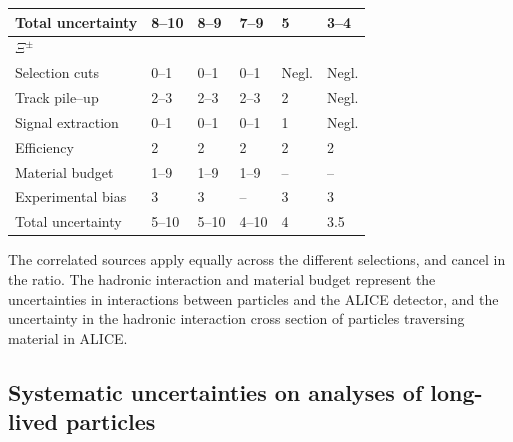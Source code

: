 \begin{table}[h!]
\begin{tabular}{|l|lllll|}
Total uncertainty     & 8--10    & 8--9     & 7--9     & 5         & 3--4          \\ \hline
\multicolumn{6}{l}{\parbox[b][1.2em]{1em}{$\Xi^\pm$}} \\
\hline
Selection cuts  & 0--1         & 0--1         & 0--1     & Negl.          & Negl.  \\
Track pile--up         & 2--3         & 2--3         & 2--3     & 2         & Negl.    \\
Signal extraction     & 0--1        & 0--1     & 0--1     & 1         & Negl. \\
Efficiency             & 2         & 2         & 2    & 2         & 2         \\
Material budget       & 1--9         & 1--9         & 1--9     & --              & --              \\
Experimental bias     & 3         & 3         & --    & 3         & 3         \\ \hline
Total uncertainty     & 5--10         & 5--10         & 4--10    & 4         & 3.5         \\ \hline
\end{tabular}
\end{table}


The correlated sources apply equally across the different \SOPT selections, and cancel in the ratio. The hadronic interaction and material budget represent the uncertainties in interactions between particles and the ALICE detector, and the uncertainty in the hadronic interaction cross section of particles traversing material in ALICE.

\subsection{Systematic uncertainties on analyses of long-lived particles}\label{Sec:SysSec}

